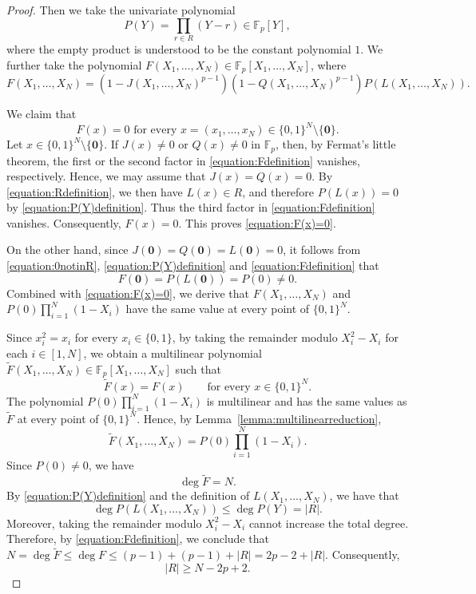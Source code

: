 \documentclass[a4paper, 12pt]{article}
\theoremstyle{definition}
\begin{document}
\begin{proof}
Then we take the univariate polynomial
\begin{equation}\label{equation:P(Y)definition}
P(Y)=\prod_{r\in R}(Y-r)\in\mathbb F_p[Y],
\end{equation}
where the empty product is understood to be the constant polynomial $1$.
We further take the polynomial $F(X_1,\ldots,X_N) \in \mathbb{F}_p[X_1,\ldots,X_N]$, where \begin{equation}\label{equation:Fdefinition}
F(X_1,\ldots,X_N)=
\left(1-J(X_1,\ldots,X_N)^{p-1}\right)
\left(1-Q(X_1,\ldots,X_N)^{p-1}\right)
P(L(X_1,\ldots,X_N)).
\end{equation}


We claim that
\begin{equation}\label{equation:F(x)=0}
F(x)=0\mbox{ for every } x=(x_1,\ldots,x_N)\in\{0,1\}^N\setminus\{\mathbf 0\}.
\end{equation}
Let $x\in\{0,1\}^N\setminus\{\mathbf 0\}$. If $J(x)\ne0$ or
$Q(x)\ne0$ in $\mathbb F_p$, then, by Fermat's
little theorem, the first or the second factor in
\eqref{equation:Fdefinition} vanishes, respectively. Hence, we may assume that $J(x)=Q(x)=0$. By
\eqref{equation:Rdefinition}, we then have $L(x)\in R$, and therefore
$P(L(x))=0$ by \eqref{equation:P(Y)definition}. Thus the third factor
in \eqref{equation:Fdefinition} vanishes. Consequently, $F(x)=0$. This proves \eqref{equation:F(x)=0}.

On the other hand, since $J(\mathbf 0)=Q(\mathbf 0)=L(\mathbf 0)=0$, it follows from \eqref{equation:0notinR}, \eqref{equation:P(Y)definition} and \eqref{equation:Fdefinition} that $$F(\mathbf 0)=P(L(\mathbf 0))=P(0)\neq 0.$$ Combined with \eqref{equation:F(x)=0}, we derive that $F(X_1,\ldots,X_N)$ and
$P(0)\prod_{i=1}^N(1-X_i)$ have the same value at every point of
$\{0,1\}^N$.

Since $x_i^2=x_i$ for every $x_i\in\{0,1\}$, by taking the remainder modulo $X_i^2-X_i$ for each $i\in[1,N]$,
we obtain a multilinear polynomial
$\widetilde F(X_1,\ldots,X_N)\in
\mathbb F_p[X_1,\ldots,X_N]$
such that
$$\widetilde F(x)=F(x)
\qquad\text{for every }x\in\{0,1\}^N.$$
The polynomial $P(0)\prod_{i=1}^N(1-X_i)$ is multilinear and has the
same values as $\widetilde F$ at every point of $\{0,1\}^N$. Hence,
by Lemma~\ref{lemma:multilinearreduction},
$$\widetilde F(X_1,\ldots,X_N)=P(0)\prod_{i=1}^N(1-X_i).$$
Since $P(0)\ne0$, we have $$\deg\widetilde F=N.$$ By \eqref{equation:P(Y)definition} and the definition of $L(X_1,\ldots,X_N)$, we have that $$\deg P(L(X_1,\ldots,X_N))\leq \deg P(Y)=|R|.$$
Moreover, taking the remainder
modulo $X_i^2-X_i$ cannot increase the total degree. Therefore, by
\eqref{equation:Fdefinition}, we conclude that
$N=\deg\widetilde F\leq\deg F\leq(p-1)+(p-1)+|R|=2p-2+|R|$.
Consequently,
\begin{equation}\label{equation:Rbound}
|R|\ge N-2p+2.
\end{equation}



\end{proof}
\end{document}
